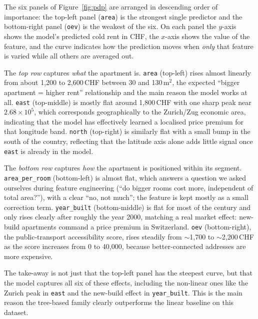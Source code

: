 \documentclass[11pt,a4paper]{article}
\begin{document}
The six panels of Figure~\ref{fig:pdp} are arranged in descending order of importance: the top-left panel (\texttt{area}) is the strongest single predictor and the bottom-right panel (\texttt{oev}) is the weakest of the six. On each panel the $y$-axis shows the model's predicted cold rent in CHF, the $x$-axis shows the value of the feature, and the curve indicates how the prediction moves when \emph{only} that feature is varied while all others are averaged out.

The \emph{top row} captures \emph{what} the apartment is. \texttt{area} (top-left) rises almost linearly from about 1{,}200 to 2{,}600\,CHF between 30 and 130\,m$^2$, the expected ``bigger apartment = higher rent'' relationship and the main reason the model works at all. \texttt{east} (top-middle) is mostly flat around 1{,}800\,CHF with one sharp peak near $2.68 \times 10^5$, which corresponds geographically to the Zurich/Zug economic area, indicating that the model has effectively learned a localised price premium for that longitude band. \texttt{north} (top-right) is similarly flat with a small bump in the south of the country, reflecting that the latitude axis alone adds little signal once \texttt{east} is already in the model.

The \emph{bottom row} captures \emph{how} the apartment is positioned within its segment. \texttt{area\_per\_room} (bottom-left) is almost flat, which answers a question we asked ourselves during feature engineering (``do bigger rooms cost more, independent of total area?''), with a clear ``no, not much''; the feature is kept mostly as a small correction term. \texttt{year\_built} (bottom-middle) is flat for most of the century and only rises clearly after roughly the year 2000, matching a real market effect: new-build apartments command a price premium in Switzerland. \texttt{oev} (bottom-right), the public-transport accessibility score, rises steadily from $\sim$1{,}700 to $\sim$2{,}200\,CHF as the score increases from 0 to 40{,}000, because better-connected addresses are more expensive.

The take-away is not just that the top-left panel has the steepest curve, but that the model captures all six of these effects, including the non-linear ones like the Zurich peak in \texttt{east} and the new-build effect in \texttt{year\_built}. This is the main reason the tree-based family clearly outperforms the linear baseline on this dataset.
\end{document}
